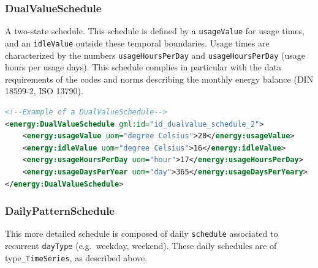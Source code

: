 \documentclass[a4paper,12pt]{article}
\begin{document}
\subsubsection{DualValueSchedule}\label{dualvalueschedule}

A two-state schedule. This schedule is defined by a
\lstinline!usageValue! for usage times, and an \lstinline!idleValue!
outside these temporal boundaries. Usage times are characterized by the
numbers \lstinline!usageHoursPerDay! and \lstinline!usageHoursPerDay!
(usage hours per usage days). This schedule complies in particular with
the data requirements of the codes and norms describing the monthly
energy balance (DIN 18599-2, ISO 13790).

\begin{lstlisting}[language=XML]
<!--Example of a DualValueSchedule-->
<energy:DualValueSchedule gml:id="id_dualvalue_schedule_2">
    <energy:usageValue uom="degree Celsius">20</energy:usageValue>
    <energy:idleValue uom="degree Celsius">16</energy:idleValue>
    <energy:usageHoursPerDay uom="hour">17</energy:usageHoursPerDay>
    <energy:usageDaysPerYear uom="day">365</energy:usageDaysPerYeary>
</energy:DualValueSchedule>
\end{lstlisting}

\subsubsection{DailyPatternSchedule}\label{dailypatternschedule}

This more detailed schedule is composed of daily \lstinline!schedule!
associated to recurrent \lstinline!dayType! (e.g.~weekday, weekend).
These daily schedules are of type\lstinline!_TimeSeries!, as described
above.
\end{document}
